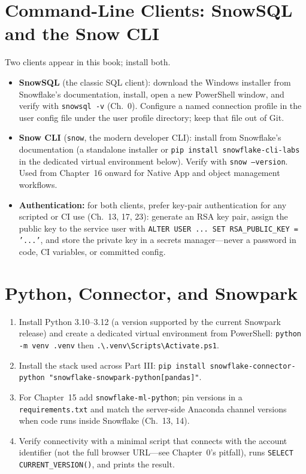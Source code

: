 \section{Command-Line Clients: SnowSQL and the Snow CLI}
Two clients appear in this book; install both.
\begin{itemize}
    \item \textbf{SnowSQL} (the classic SQL client): download the Windows installer from
    Snowflake's documentation, install, open a new PowerShell window, and verify with
    \texttt{snowsql -v} (Ch.~0). Configure a named connection profile in the user config file
    under the user profile directory; keep that file out of Git.
    \item \textbf{Snow CLI} (\texttt{snow}, the modern developer CLI): install from Snowflake's
    documentation (a standalone installer or \texttt{pip install snowflake-cli-labs} in the
    dedicated virtual environment below). Verify with \texttt{snow --version}. Used from
    Chapter~16 onward for Native App and object management workflows.
    \item \textbf{Authentication:} for both clients, prefer key-pair authentication for any
    scripted or CI use (Ch.~13, 17, 23): generate an RSA key pair, assign the public key to the
    service user with \texttt{ALTER USER ... SET RSA\_PUBLIC\_KEY = '...'}, and store the
    private key in a secrets manager---never a password in code, CI variables, or committed
    config.
\end{itemize}

\section{Python, Connector, and Snowpark}
\begin{enumerate}
    \item Install Python 3.10--3.12 (a version supported by the current Snowpark release) and
    create a dedicated virtual environment from PowerShell:
    \texttt{python -m venv .venv} then \texttt{.\textbackslash .venv\textbackslash Scripts\textbackslash Activate.ps1}.
    \item Install the stack used across Part III:
    \texttt{pip install snowflake-connector-python "snowflake-snowpark-python[pandas]"}.
    \item For Chapter~15 add \texttt{snowflake-ml-python}; pin versions in a
    \texttt{requirements.txt} and match the server-side Anaconda channel versions when code runs
    inside Snowflake (Ch.~13, 14).
    \item Verify connectivity with a minimal script that connects with the account identifier
    (not the full browser URL---see Chapter~0's pitfall), runs
    \texttt{SELECT CURRENT\_VERSION()}, and prints the result.
\end{enumerate}

